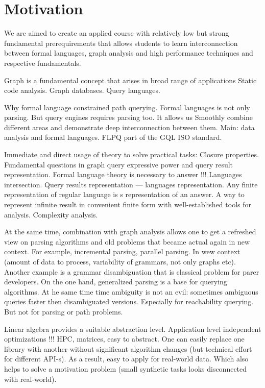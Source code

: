 \documentclass[sigconf]{acmart}
\begin{document}
\section{Motivation}

We are aimed to create an applied course with relatively low but strong fundamental prerequirements that allows students to learn interconnection between formal languages, graph analysis and high performance techniques and respective fundamentals.

Graph is a fundamental concept that arises in broad range of applications Static code analysis. Graph databases. Query languages.

Why formal language constrained path querying. 
Formal languages is not only parsing.
But query engines requires parsing too.
It allows us Smoothly combine different areas and demonstrate deep interconnection between them.
Main: data analysis and formal languages.
FLPQ part of the GQL ISO standard.

Immediate and direct usage of theory to solve practical tasks: Closure properties.
Fundamental questions in graph query expressive power and query result representation. 
Formal language theory is necessary to answer !!!
 Languages intersection.
Query results representation --- languages representation.
Any finite representation of regular language is s representation of an answer.
A way to represent infinite result in convenient finite form with well-established tools for analysis.
Complexity analysis.

At the same time, combination with graph analysis allows one to get a refreshed view on parsing algorithms and old problems that became actual again in new context.
For example, incremental parsing, parallel parsing. 
In wew context (amount of data to process, variability of grammars, not only graphs etc).
Another example is a grammar disambiguation that is classical problem for parer developers.
On the one hand, generalized parsing is a base for querying algorithms. 
At he same time time ambiguity is not an evil: sometimes ambiguous queries faster then disambiguated versions.
Especially for reachability querying.
But not for parsing or path problems.

Linear algebra provides a suitable abstraction level. 
Application level independent optimizations !!! HPC, matrices, easy to abstract.
One can easily replace one library with another without significant algorithm changes (but technical effort for different API-s).
As a result, easy to apply for real-world data.
Which also helps to solve a motivation problem (small synthetic tasks looks disconnected with real-world).
\end{document}
